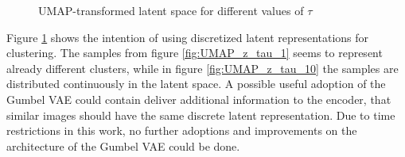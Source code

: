 \documentclass[12pt,DIV14,BCOR12mm,a4paper,footexclude,headinclude,halfparskip-,twoside,openright,openany,cleardoubleempty,idxtotoc,bibtotoc]{scrreprt} %
\numberwithin{equation}{chapter}
\begin{document}
	\begin{figure}[htb!]
	\centering
	\qquad
	\qquad
	\qquad
	\qquad
	\caption{UMAP-transformed latent space for different values of $\tau$}
	\label{fig:Different_GumbelTemperatures_UMAP}
\end{figure}
Figure \ref{fig:Different_GumbelTemperatures_UMAP} shows the intention of using discretized latent representations for clustering. The samples from figure \ref{fig:UMAP_z_tau_1} seems to represent already different clusters, while in figure \ref{fig:UMAP_z_tau_10} the samples are distributed continuously in the latent space. A possible useful adoption of the Gumbel VAE could contain deliver additional information to the encoder, that similar images should have the same discrete latent representation. Due to time restrictions in this work, no further adoptions and improvements on the architecture of the Gumbel VAE could be done.\\
\end{document}
